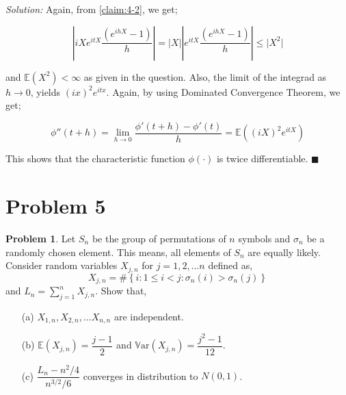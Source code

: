 \documentclass[12pt]{article}
\newcommand{\E}{\mathbb{E}}
\newcommand{\Var}{\mathbb{V}\text{ar}}
\theoremstyle{definition}
\newtheorem*{prb}{Problem}
\newenvironment{problem}{
\begin{tcolorbox}[colback=blue!5!white,colframe=blue!75!black, parbox = true] \begin{prb}  }{\end{prb}\end{tcolorbox} }
\newenvironment{answer}{\textit{Solution: }\quad }{ \hfill $\blacksquare$}
\begin{document}
\begin{answer}
	Again, from \cref{claim:4-2}, we get;

	$$
	\left\vert iX e^{itX}\dfrac{(e^{ihX} - 1)}{h} \right\vert
	= \vert X \vert \left\vert e^{itX}\dfrac{(e^{ihX} - 1)}{h} \right\vert
	\leq \vert X^2 \vert
	$$

	and $\E(X^2) < \infty$ as given in the question. Also, the limit of the integrad as $h \rightarrow 0$, yields $(ix)^2 e^{itx}$. Again, by using Dominated Convergence Theorem, we get;

	$$
	\phi''(t+h)
	= \lim_{h \rightarrow 0} \dfrac{\phi'(t+h) - \phi'(t)}{h}
	= \E \left( (iX)^2 e^{itX} \right)
	$$

	This shows that the characteristic function $\phi(\cdot)$ is twice differentiable. 
\end{answer}

\pagebreak
\section{Problem 5}
\begin{problem}
	Let $S_n$ be the group of permutations of $n$ symbols and $\sigma_n$ be a randomly chosen element. This means, all elements of $S_n$ are equally likely. Consider random variables $X_{j, n}$ for $j = 1, 2, \dots n$ defined as,
	$$X_{j, n} = \# \left\{ i : 1 \leq i < j : \sigma_n(i) > \sigma_n(j)  \right\}$$
	and $L_n = \sum_{j=1}^{n} X_{j, n}$. Show that,
	\begin{enumerate}
		\item[(a)] $X_{1,n}, X_{2, n}, \dots X_{n,n}$ are independent.
		\item[(b)] $\E(X_{j,n}) = \dfrac{j-1}{2}$ and $\Var(X_{j,n}) = \dfrac{j^2 - 1}{12}$.
		\item[(c)] $\dfrac{L_n - n^2 / 4}{n^{3/2}/6}$ converges in distribution to $N(0, 1)$.  
	\end{enumerate}
\end{problem}
\end{document}
